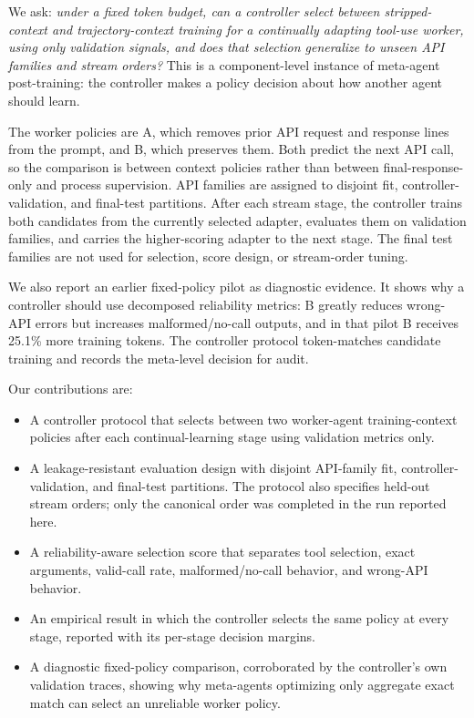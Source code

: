 \documentclass{article}
\begin{document}
We ask: \emph{under a fixed token budget, can a controller select between stripped-context and trajectory-context training for a continually adapting tool-use worker, using only validation signals, and does that selection generalize to unseen API families and stream orders?} This is a component-level instance of meta-agent post-training: the controller makes a policy decision about how another agent should learn.

The worker policies are A, which removes prior API request and response lines from the prompt, and B, which preserves them. Both predict the next API call, so the comparison is between context policies rather than between final-response-only and process supervision. API families are assigned to disjoint fit, controller-validation, and final-test partitions. After each stream stage, the controller trains both candidates from the currently selected adapter, evaluates them on validation families, and carries the higher-scoring adapter to the next stage. The final test families are not used for selection, score design, or stream-order tuning.

We also report an earlier fixed-policy pilot as diagnostic evidence. It shows why a controller should use decomposed reliability metrics: B greatly reduces wrong-API errors but increases malformed/no-call outputs, and in that pilot B receives 25.1\% more training tokens. The controller protocol token-matches candidate training and records the meta-level decision for audit.

Our contributions are:
\begin{itemize}[leftmargin=*]
    \item A controller protocol that selects between two worker-agent training-context policies after each continual-learning stage using validation metrics only.
    \item A leakage-resistant evaluation design with disjoint API-family fit, controller-validation, and final-test partitions. The protocol also specifies held-out stream orders; only the canonical order was completed in the run reported here.
    \item A reliability-aware selection score that separates tool selection, exact arguments, valid-call rate, malformed/no-call behavior, and wrong-API behavior.
    \item An empirical result in which the controller selects the same policy at every stage, reported with its per-stage decision margins.
    \item A diagnostic fixed-policy comparison, corroborated by the controller's own validation traces, showing why meta-agents optimizing only aggregate exact match can select an unreliable worker policy.
\end{itemize}
\end{document}
